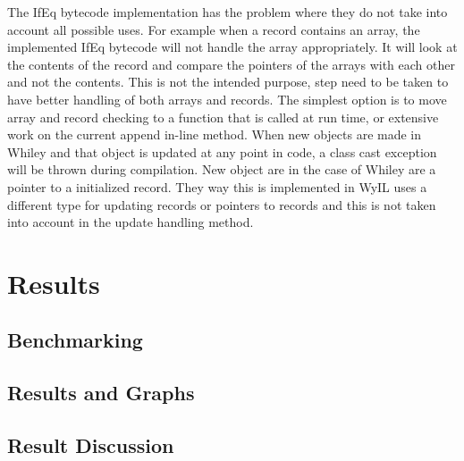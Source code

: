 The IfEq bytecode implementation has the problem where they do not take into account all possible uses. For example when a record contains an array, the implemented IfEq bytecode will not handle the array appropriately. It will look at the contents of the record and compare the pointers of the arrays with each other and not the contents. This is not the intended purpose, step need to be taken to have better handling of both arrays and records. The simplest option is to move array and record checking to a function that is called at run time, or extensive work on the current append in-line method. 
When new objects are made in Whiley and that object is updated at any point in code, a class cast exception will be thrown during compilation. New object are in the case of Whiley are a pointer to a initialized record. They way this is implemented in WyIL uses a different type for updating records or pointers to records and this is not taken into account in the update handling method.  

\section{Results}

\subsection{Benchmarking}

\subsection{Results and Graphs}

\subsection{Result Discussion}


